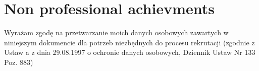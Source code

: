 \documentclass[11pt,a4paper,sans]{moderncv} %
\begin{document}

\section{Non professional achievments}

\footnotesize{
  \vfill
Wyrażam zgodę na przetwarzanie moich danych osobowych zawartych w niniejszym dokumencie dla potrzeb niezbędnych do procesu rekrutacji
(zgodnie z Ustaw a z dnia 29.08.1997 o ochronie danych osobowych, Dziennik Ustaw Nr 133 Poz. 883)
}


%
%
%
%

\end{document}
